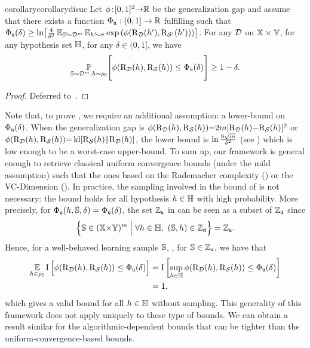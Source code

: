 \begin{restatable}{corollary}{corollarydisuc} \label{chap:dis-mu:corollary:dis-uc}
Let $\phi\!:\! [0,1]^2{\to}\Rbb$ be the generalization gap and assume that there exists a function $\PhiUC: (0,1]\to\Rbb$ fulfilling  such that $\PhiUC(\delta) \ge \ln\!\LB \frac{4}{\delta^2} \EE_{\S'\!{\sim}\D^\m}\EE_{\h'\!{\sim}\P} \exp\LP\phi(\Risk_{\D}(\h{'}),\Risk_{\dS'}(\h'))\RP\RB$.
For any $\D$ on $\X\times\Y$, for any hypothesis set $\H$, for any $\delta\in(0, 1]$, we have
\begin{align*}
    \PP_{\S\sim\D^\m, \h\sim\AQ}\!\Bigg[ \phi(\Risk_{\D}(\h), \Risk_{\dS}(\h)) \le \PhiUC(\delta) \Bigg] \ge 1-\delta.
\end{align*}
\end{restatable}
\begin{noaddcontents}\begin{proof}
Deferred to~.
\end{proof}\end{noaddcontents}

Note that, to prove , we require an additional assumption: a lower-bound on $\PhiUC(\delta)$.
When the generalization gap is $\phi(\Risk_{\D}(\h), \Risk_{\dS}(\h)){=}2m[\Risk_{\D}(\h){-}\Risk_{\dS}(\h)]^2$ or $\phi(\Risk_{\D}(\h), \Risk_{\dS}(\h)){=}\kl[\Risk_{\dS}(\h)\|\Risk_{\D}(\h)]$, the lower bound is $\ln\frac{8\sqrt{\m}}{\delta^2}$ (see ) which is low enough to be a worst-case upper-bound.
To sum up, our framework is general enough to retrieve classical uniform convergence bounds (under the mild assumption) such that the ones based on the Rademacher complexity () or the VC-Dimension ().
In practice, the sampling involved in the bound of  is not necessary: the bound holds for all hypothesis $\h\in\H$ with high probability.
More precisely, for $\PhiUC(\h,\S,\delta)=\PhiUC(\delta)$, the set $\setUC$ in  can be seen as a subset of $\setD$ since
\begin{align*}
    \Big\{ \S\in(\X{\times}\Y)^\m \;\Big|\; \forall \h\in\H,\ (\S,\h)\in\setD \Big\} = \setUC.
\end{align*}
Hence, for a well-behaved learning sample $\S$, \ie, for $\S\in\setUC$, we have that
\begin{align*}
    \EE_{\h\in\AQ}\indic\Big[ \phi(\Risk_{\D}(\h), \Risk_{\dS}(\h)) \le \PhiUC(\delta) \Big] &= \indic\LB \sup_{\h\in\H}\phi(\Risk_{\D}(\h), \Risk_{\dS}(\h)) \le \PhiUC(\delta) \RB\\
    &= 1,
\end{align*}
which gives a valid bound for all $\h\in\H$ without sampling.
This generality of this framework does not apply uniquely to these type of bounds. 
We can obtain a result similar for the algorithmic-dependent bounds that can be tighter than the uniform-convergence-based bounds. 

